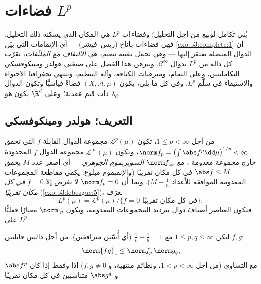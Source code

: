 \chapter{فضاءات \texorpdfstring{$L^p$}{Lp}}\label{ch:b3:lp}

بُني تكامل لوبيغ من أجل التحليل؛ وفضاءات $L^p$ هي المكان الذي
يسكنه ذلك التحليل. فهي فضاءات باناخ (ريس--فيشر) --- أي
الإتمامات التي بيّن \cref{exo:b3:complete:1} أن الدوال المتصلة تفتقر إليها ---
وهي تحمل تقنية تنعيم، هي \emph{الالتفاف مع المليِّفات}، تقرّب
كل دالة من $L^p$ بدوال $\mathcal C^\infty$. ويبرهن هذا الفصل على صيغتي هولدر
ومينكوفسكي التكامليتين، وعلى التمام، ومبرهنات الكثافة، وآلة
التنظيم، وينتهي بجغرافيا الاحتواء والاستيفاء في سلّم $L^p$. وفي
كل ما يلي، يكون $(X, \mathcal A, \mu)$ فضاءً قياسيًّا وتكون الدوال ذات قيم عقدية؛
وعلى $\R^d$ يكون  هو $\lambda_d$.

\section{التعريف؛ هولدر ومينكوفسكي}

\begin{definition}\label{def:b3:lp:space}
من أجل $1 \leq p < \infty$، تكون $\mathcal L^p(\mu)$ مجموعة الدوال القابلة  $f$ التي
تحقق $\norm f_p = \bigl(\int\abs
f^p\dd\mu\bigr)^{1/p} < \infty$، وتكون $\mathcal L^\infty(\mu)$ مجموعة الدوال $f$ المحدودة خارج مجموعة
معدومة ، مع $\norm
f_\infty$ \emph{السوپريموم الجوهري} --- أي أصغر
عدد $M$ يحقق $\abs f \leq M$ في كل مكان تقريبًا (والإنفيموم
مبلوغ: يكفي مقاطعة المجموعات المعدومة الموافقة للأعداد
$M + \frac1n$). وبما أن $\norm f_p = 0$ لا يفرض إلا $f
= 0$
\emph{في كل مكان تقريبًا} (\cref{exo:b3:lebesgue:5})، نعرّف
\[
L^p(\mu) = \mathcal L^p(\mu)/\{f = 0 \text{ في كل مكان تقريبًا}\} :
\]
فتكون العناصر أصنافَ دوال بترديد المجموعات المعدومة، ويكون
$\norm\cdot_p$ معيارًا فعليًّا على
$L^p$.
\end{definition}

\begin{theorem}\label{thm:b3:lp:holder}
ليكن $1 \leq p, q \leq \infty$ مع $\frac1p + \frac1q = 1$
(أي أُسّين مترافقين). من أجل دالتين قابلتين  $f, g$:
\[
\norm{fg}_1 \leq \norm f_p\,\norm g_q ,
\]
مع التساوي (من أجل $1 < p < \infty$، ونظائم منتهية،
و $f,g\ne0$) إذا وفقط إذا كان $\abs f^p$ و $\abs g^q$ متناسبين
في كل مكان تقريبًا.
\end{theorem}

